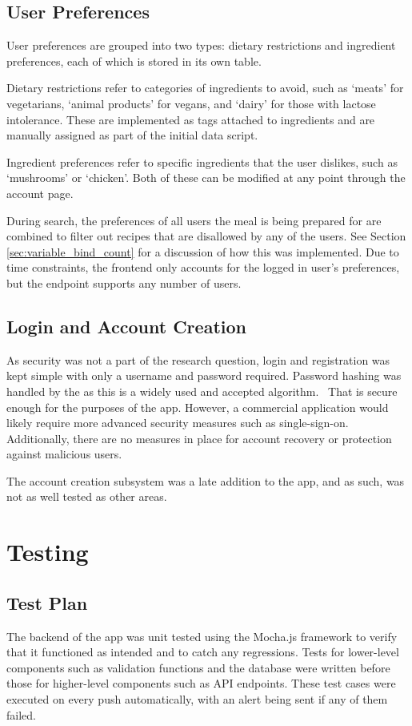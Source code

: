\subsection{User Preferences}
User preferences are grouped into two types: dietary restrictions and ingredient preferences, each of which is stored
in its own table.

Dietary restrictions refer to categories of ingredients to avoid, such as \enquote*{meats} for vegetarians,
\enquote*{animal products} for vegans, and \enquote*{dairy} for those with lactose intolerance. These are implemented
as tags attached to ingredients and are manually assigned as part of the initial data script.

Ingredient preferences refer to specific ingredients that the user dislikes, such as \enquote*{mushrooms} or
\enquote*{chicken}. Both of these can be modified at any point through the account page.

During search, the preferences of all users the meal is being prepared for are combined to filter out recipes
that are disallowed by any of the users. See Section \ref{sec:variable_bind_count} for a discussion of how this was implemented.
Due to time constraints, the frontend only accounts for the logged in user's preferences, but the endpoint
supports any number of users.

\subsection{Login and Account Creation}
As security was not a part of the research question, login and registration was kept simple with only a username
and password required. Password hashing was handled by the  as this is a widely used and
accepted algorithm.~\cite{ntantogian_evaluation_2019} That is secure enough for the purposes of the app. However,
a commercial application would likely require more advanced security measures such as single-sign-on. Additionally,
there are no measures in place for account recovery or protection against malicious users.

The account creation subsystem was a late addition to the app, and as such, was not as well tested as other areas.

\section{Testing}

\subsection{Test Plan}
The backend of the app was unit tested using the Mocha.js framework
to verify that it functioned as intended and to catch any regressions. Tests for lower-level components
such as validation functions and the database were written before those for higher-level
components such as API endpoints. These test cases were executed on every push automatically,
with an alert being sent if any of them failed.

